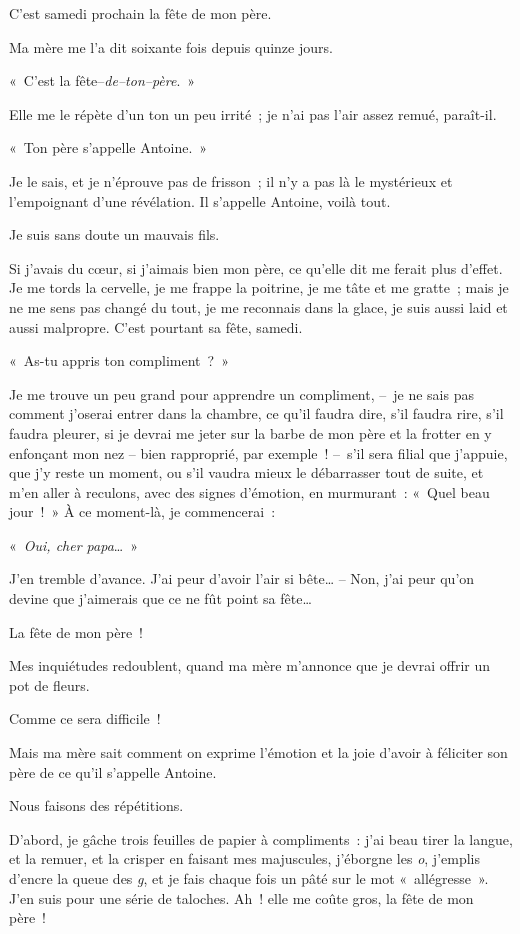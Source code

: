 \documentclass[french,twoside]{book} %
\begin{document}
\noindent C’est samedi prochain la fête de mon père.\par
Ma mère me l’a dit soixante fois depuis quinze jours.\par
« C’est la fête–\emph{de–ton–père}. »\par
Elle me le répète d’un ton un peu irrité ; je n’ai pas l’air assez remué, paraît-il.\par
« Ton père s’appelle Antoine. »\par
Je le sais, et je n’éprouve pas de frisson ; il n’y a pas là le mystérieux et l’empoignant d’une révélation. Il s’appelle Antoine, voilà tout.\par
Je suis sans doute un mauvais fils.\par
Si j’avais du cœur, si j’aimais bien mon père, ce qu’elle dit me ferait plus d’effet. Je me tords la cervelle, je me frappe la poitrine, je me tâte et me gratte ; mais je ne me sens pas changé du tout, je me reconnais dans la glace, je suis aussi laid et aussi malpropre. C’est pourtant sa fête, samedi.\par
\bigbreak
\noindent « As-tu appris ton compliment ? »\par
Je me trouve un peu grand pour apprendre un compliment, – je ne sais pas comment j’oserai entrer dans la chambre, ce qu’il faudra dire, s’il faudra rire, s’il faudra pleurer, si je devrai me jeter sur la barbe de mon père et la frotter en y enfonçant mon nez – bien rapproprié, par exemple ! – s’il sera filial que j’appuie, que j’y reste un moment, ou s’il vaudra mieux le débarrasser tout de suite, et m’en aller à reculons, avec des signes d’émotion, en murmurant : « Quel beau jour ! » À ce moment-là, je commencerai :\par
« \emph{Oui, cher papa}… »\par
J’en tremble d’avance. J’ai peur d’avoir l’air si bête… – Non, j’ai peur qu’on devine que j’aimerais que ce ne fût point sa fête…\par
La fête de mon père !\par
\bigbreak
\noindent Mes inquiétudes redoublent, quand ma mère m’annonce que je devrai offrir un pot de fleurs.\par
Comme ce sera difficile !\par
Mais ma mère sait comment on exprime l’émotion et la joie d’avoir à féliciter son père de ce qu’il s’appelle Antoine.\par
Nous faisons des répétitions.\par
D’abord, je gâche trois feuilles de papier à compliments : j’ai beau tirer la langue, et la remuer, et la crisper en faisant mes majuscules, j’éborgne les \emph{o}, j’emplis d’encre la queue des \emph{g}, et je fais chaque fois un pâté sur le mot « allégresse ». J’en suis pour une série de taloches. Ah ! elle me coûte gros, la fête de mon père !\par
\end{document}
